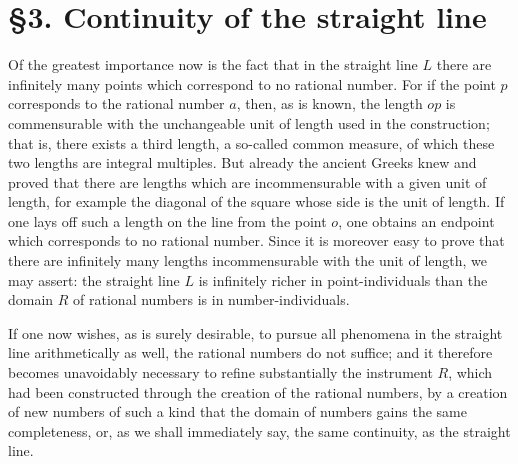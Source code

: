 \documentclass[11pt]{article}
\begin{document}
\section*{\S 3. Continuity of the straight line}

Of the greatest importance now is the fact that in the straight line $L$ there are infinitely many points which correspond to no rational number. For if the point $p$ corresponds to the rational number $a$, then, as is known, the length $op$ is commensurable with the unchangeable unit of length used in the construction; that is, there exists a third length, a so-called common measure, of which these two lengths are integral multiples. But already the ancient Greeks knew and proved that there are lengths which are incommensurable with a given unit of length, for example the diagonal of the square whose side is the unit of length. If one lays off such a length on the line from the point $o$, one obtains an endpoint which corresponds to no rational number. Since it is moreover easy to prove that there are infinitely many lengths incommensurable with the unit of length, we may assert: the straight line $L$ is infinitely richer in point-individuals than the domain $R$ of rational numbers is in number-individuals.

If one now wishes, as is surely desirable, to pursue all phenomena in the straight line arithmetically as well, the rational numbers do not suffice; and it therefore becomes unavoidably necessary to refine substantially the instrument $R$, which had been constructed through the creation of the rational numbers, by a creation of new numbers of such a kind that the domain of numbers gains the same completeness, or, as we shall immediately say, the same continuity, as the straight line.
\end{document}
